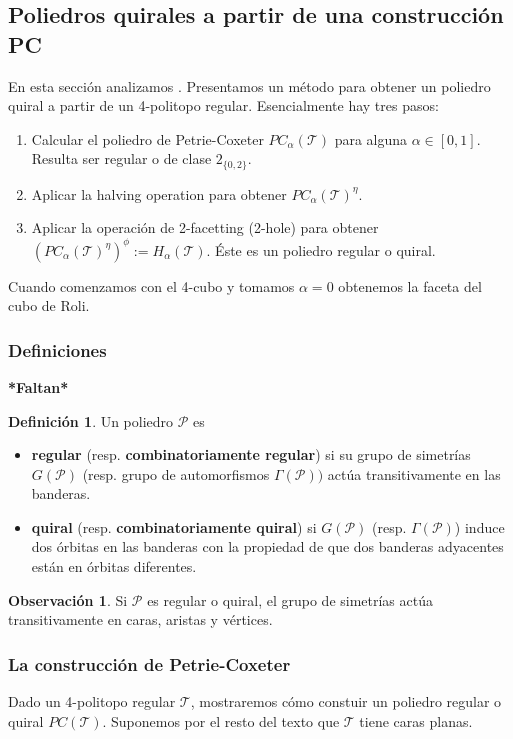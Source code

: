 \documentclass[spanish]{article}
\theoremstyle{definition}
\newtheorem*{defn}{Definición}
\newtheorem*{obs}{Observación}
\newcommand{\p}{\mathcal{P}}
\newcommand{\T}{\mathcal{T}}
\begin{document}
\subsection{Poliedros quirales a partir de una construcción PC}
En esta sección analizamos \cite{bracho2021quiral}. Presentamos un método para obtener un poliedro quiral a partir de un 4-politopo regular. Esencialmente hay tres pasos:
\begin{enumerate}
	\item Calcular el poliedro de Petrie-Coxeter $PC_\alpha(\mathcal{T})$ para alguna $\alpha\in[0,1]$. Resulta ser regular o de clase $2_{\{0,2\}}$.
	\item Aplicar la halving operation para obtener $PC_\alpha(\mathcal{T})^\eta$.
	\item Aplicar la operación de 2-facetting (2-hole) para obtener $(PC_\alpha(\mathcal{T})^\eta)^\phi:=H_\alpha(\mathcal{T})$. Éste es un poliedro regular o quiral.
\end{enumerate}
Cuando comenzamos con el 4-cubo y tomamos $\alpha=0$ obtenemos la faceta del cubo de Roli.

\subsubsection{Definiciones}
\textbf{*Faltan*}
\begin{defn}Un poliedro $\p$ es
	\begin{itemize}
		\item \textbf{regular} (resp. \textbf{combinatoriamente regular}) si su grupo de simetrías $G(\p)$ (resp. grupo de automorfismos $\Gamma(\p))$ actúa transitivamente en las banderas.
		
		\item \textbf{quiral} (resp. \textbf{combinatoriamente quiral}) si $G(\p)$ (resp. $\Gamma(\p)$) induce dos órbitas en las banderas con la propiedad de que dos banderas adyacentes están en órbitas diferentes.
	\end{itemize}
\end{defn}
\begin{obs}
	Si $\p$ es regular o quiral, el grupo de simetrías actúa transitivamente en caras, aristas y vértices.
\end{obs}

\subsubsection{La construcción de Petrie-Coxeter}
Dado un 4-politopo regular $\T$, mostraremos cómo constuir un poliedro regular o quiral $PC(\T)$. Suponemos por el resto del texto que $\T$ tiene caras planas.
\end{document}
